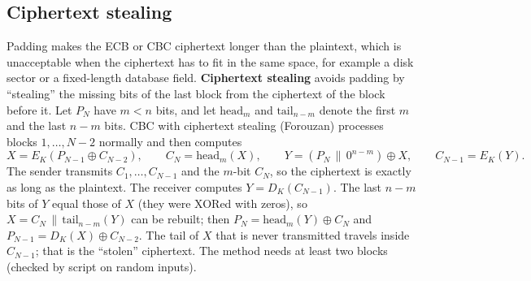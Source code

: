 \subsection{Ciphertext stealing}
Padding makes the ECB or CBC ciphertext longer than the plaintext, which is unacceptable when the ciphertext has to fit in the same space, for example a disk sector or a fixed-length database field. \textbf{Ciphertext stealing} avoids padding by ``stealing'' the missing bits of the last block from the ciphertext of the block before it. Let $P_N$ have $m < n$ bits, and let $\mathrm{head}_m$ and $\mathrm{tail}_{n-m}$ denote the first $m$ and the last $n - m$ bits. CBC with ciphertext stealing (Forouzan) processes blocks $1, \dots, N-2$ normally and then computes
\[
X = E_K(P_{N-1} \oplus C_{N-2}), \qquad C_N = \mathrm{head}_m(X), \qquad Y = (P_N \,\|\, 0^{n-m}) \oplus X, \qquad C_{N-1} = E_K(Y).
\]
The sender transmits $C_1, \dots, C_{N-1}$ and the $m$-bit $C_N$, so the ciphertext is exactly as long as the plaintext. The receiver computes $Y = D_K(C_{N-1})$. The last $n - m$ bits of $Y$ equal those of $X$ (they were XORed with zeros), so $X = C_N \,\|\, \mathrm{tail}_{n-m}(Y)$ can be rebuilt; then $P_N = \mathrm{head}_m(Y) \oplus C_N$ and $P_{N-1} = D_K(X) \oplus C_{N-2}$. The tail of $X$ that is never transmitted travels inside $C_{N-1}$; that is the ``stolen'' ciphertext. The method needs at least two blocks (checked by script on random inputs).

